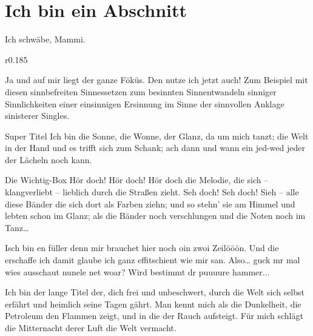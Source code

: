 \documentclass[twocolumn]{article}
\begin{document}
\section{Ich bin ein Abschnitt}
\begin{figure*}
    \begin{definition}{Ich schwäbe, Mammi.}
        \vspace*{-\baselineskip}\begin{wrapfigure}[3]{r}{0.185\linewidth}
            \centering\vspace*{-2.33\baselineskip}
        \end{wrapfigure}Ja und auf mir liegt der ganze Föküs. Den nutze ich jetzt auch! Zum Beispiel mit diesen sinnbefreiten Sinnessetzen zum besinnten Sinnentwandeln sinniger Sinnlichkeiten einer einsinnigen Ersinnung im Sinne der sinnvollen Anklage sinisterer Singles. 
    \end{definition}
\end{figure*}
    \blindtext[5]

    \begin{definition}{Super Titel}
        Ich bin die Sonne, die Wonne, der Glanz, da um mich tanzt; die Welt in der Hand und es trifft sich zum
        Schank; ach dann und wann ein jed-wed jeder der Lächeln noch kann.
    \end{definition}

    \blindtext[3]

    \begin{definition*}{Die Wichtig-Box}
        Hör doch! Hör doch! Hör doch die Melodie, die sich -- klangverliebt -- lieblich durch die Straßen zieht. 
        Seh doch! Seh doch! Sieh -- alle diese Bänder die sich dort
        als Farben ziehn; und so stehn' sie am Himmel und lebten
        schon im Glanz; als die Bänder noch verschlungen und
        die Noten noch im Tanz\ldots
    \end{definition*}

    \blindtext[1]

    Isch bin en füller denn mir brauchet hier noch oin zwoi Zeilööön.  Und die erschaffe ich damit glaube ich ganz effitschient wie mir san. Also\ldots{} guck mr mal wies ausschaut nunele net woar? Wird bestimmt dr puuuure hammer...
    \begin{definition}{Ich bin der lange Titel der, dich frei und unbeschwert, durch die Welt sich selbst erfährt und heimlich seine Tagen gährt.}
        Man kennt mich als die Dunkelheit, die Petroleum den Flammen zeigt, und in die der Rauch aufsteigt.
        Für mich schlägt die Mitternacht derer Luft die Welt
        vermacht.
    \end{definition}
\end{document}
